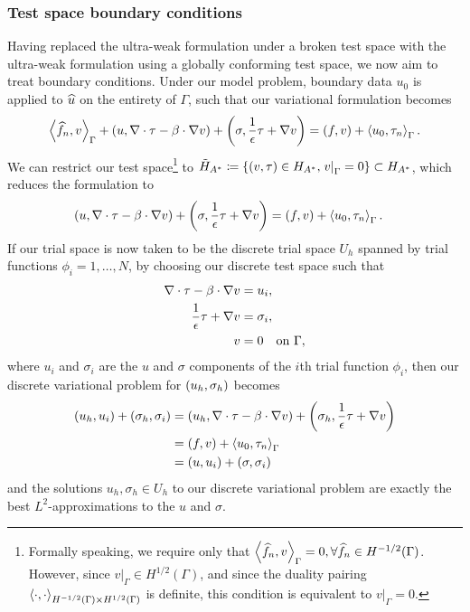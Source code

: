 \subsubsection{Test space boundary conditions}
\label{L2OptTestBC}
Having replaced the ultra-weak formulation under a broken test space with the ultra-weak formulation using a globally conforming test space, we now aim to treat boundary conditions.  Under our model problem, boundary data $u_0$ is applied to $\uh$ on the entirety of $\Gamma$, such that our variational formulation becomes
\[
\LRa{\fnh,v}_{\Gamma} + \LRp{u, \Grad\cdot \tau - \beta\cdot \Grad v} + \LRp{\sigma, \frac{1}{\epsilon}\tau + \Grad v} = \LRp{f,v} + \LRa{u_0,\tau_n}_{\Gamma}.
\]
We can restrict our test space\footnote{Formally speaking, we require only that $\LRa{\fnh,v}_\Gamma = 0, \forall \fnh\in H^{-1/2}(\Gamma)$.  However, since $\left.v\right|_\Gamma \in H^{1/2}(\Gamma)$, and since the duality pairing $\LRa{\cdot,\cdot}_{H^{-1/2}(\Gamma)\times H^{1/2}(\Gamma)}$ is definite, this condition is equivalent to $\left.v\right|_\Gamma = 0$.} to $\tilde{H}_{A^*} \coloneqq \LRc{\LRp{v,\tau} \in H_{A^*}, \left.v\right|_\Gamma = 0} \subset H_{A^*}$, which reduces the formulation to
\begin{align*}
\LRp{u, \Grad\cdot \tau - \beta\cdot \Grad v} + \LRp{\sigma, \frac{1}{\epsilon}\tau + \Grad v} &= \LRp{f,v} + \LRa{u_0,\tau_n}_{\Gamma}.
\end{align*}
If our trial space is now taken to be the discrete trial space ${U}_h$ spanned by trial functions $\phi_i = 1,\ldots,N$, by choosing our discrete test space such that 
\begin{align*}
\div \tau - \beta\cdot \Grad v &= u_i,\\
\frac{1}{\epsilon}\tau + \Grad v &= \sigma_i,\\
v &= 0 \quad \text{on } \Gamma,
\end{align*}
where $u_i$ and $\sigma_i$ are the $u$ and $\sigma$ components of the $i$th trial function $\phi_i$, then our discrete variational problem for $\LRp{u_h,\sigma_h}$ becomes
\begin{align*}
\LRp{u_h,u_i} + \LRp{\sigma_h,\sigma_i}  &= \LRp{u_h, \Grad\cdot \tau - \beta\cdot \Grad v} + \LRp{\sigma_h, \frac{1}{\epsilon}\tau + \Grad v}  \\
&= \LRp{f,v} + \LRa{u_0,\tau_n}_{\Gamma} \\
&= \LRp{u,u_i} + \LRp{\sigma,\sigma_i}
\end{align*}
and the solutions $u_h,\sigma_h \in {U}_h$ to our discrete variational problem are exactly the best $L^2$-approximations to the $u$ and $\sigma$.

